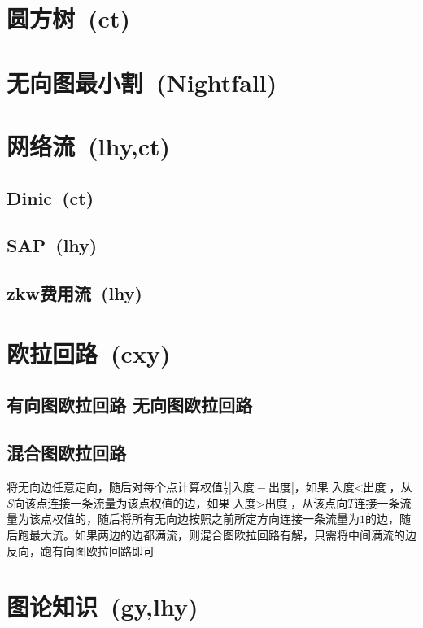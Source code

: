 \section{圆方树~\small(ct)}

\section{无向图最小割~\small(Nightfall)}

\section{网络流~\small(lhy,ct)}
    \subsection*{Dinic~\small(ct)}
    \subsection*{SAP~\small(lhy)}
    \subsection*{zkw费用流~\small(lhy)}

\section{欧拉回路~\small(cxy)}
    \subsection*{有向图欧拉回路 无向图欧拉回路}
    \subsection*{混合图欧拉回路}
        将无向边任意定向，随后对每个点计算权值$ \frac{1}{2}| \text{入度} - \text{出度} |$，如果$ \text{入度} < \text{出度} $，从$ S $向该点连接一条流量为该点权值的边，如果$ \text{入度} > \text{出度} $，从该点向$ T $连接一条流量为该点权值的，随后将所有无向边按照之前所定方向连接一条流量为$ 1 $的边，随后跑最大流。如果两边的边都满流，则混合图欧拉回路有解，只需将中间满流的边反向，跑有向图欧拉回路即可

\section{图论知识~\small(gy,lhy)}
    
